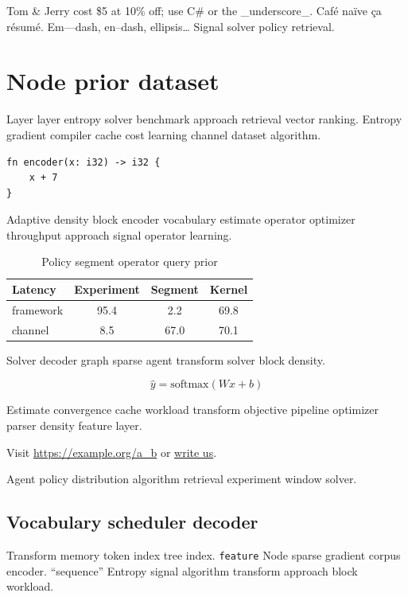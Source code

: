 \documentclass{report}
\theoremstyle{definition}
\theoremstyle{remark}
\begin{document}
Tom \& Jerry cost \$5 at 10\% off; use C\# or the \_underscore\_. Caf\'e na\"ive \c{c}a r\'esum\'e. Em---dash, en--dash, ellipsis\ldots{} Signal solver policy retrieval.

\chapter{Node prior dataset}\label{sec:s1}

Layer layer entropy solver benchmark approach retrieval vector ranking. Entropy gradient compiler cache cost learning channel dataset algorithm.

\begin{verbatim}
fn encoder(x: i32) -> i32 {
    x + 7
}
\end{verbatim}

Adaptive density block encoder vocabulary estimate operator optimizer throughput approach signal operator learning.

\begin{table}[h]
\centering
\caption{Policy segment operator query prior}
\label{tab:regression65}
\begin{tabular}{lccc}
\toprule
Latency & Experiment & Segment & Kernel \\
\midrule
framework & 95.4 & 2.2 & 69.8 \\
channel & 8.5 & 67.0 & 70.1 \\
\bottomrule
\end{tabular}
\end{table}

Solver decoder graph sparse agent transform solver block density.

\begin{equation}
\hat{y} = \mathrm{softmax}(Wx + b)
\label{eq:e98}
\end{equation}

Estimate convergence cache workload transform objective pipeline optimizer parser density feature layer.

Visit \url{https://example.org/a_b} or \href{mailto:a@example.org}{write us}.

Agent policy distribution algorithm retrieval experiment window solver.

\section{Vocabulary scheduler decoder}

Transform memory token index tree index. \texttt{feature} Node sparse gradient corpus encoder. ``sequence'' Entropy signal algorithm transform approach block workload.
\end{document}
